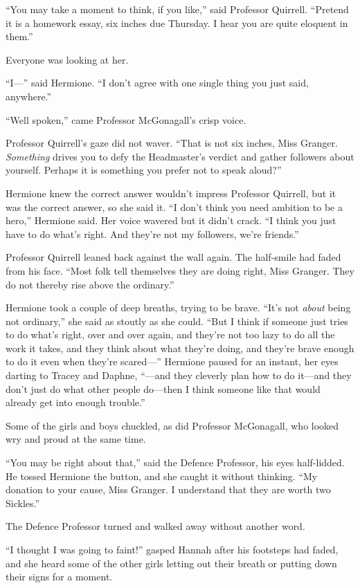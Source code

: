 ``You may take a moment to think, if you like,'' said Professor
Quirrell. ``Pretend it is a homework essay, six inches due Thursday. I
hear you are quite eloquent in them.''

Everyone was looking at her.

``I---'' said Hermione. ``I don't agree with one single thing you just
said, anywhere.''

``Well spoken,'' came Professor McGonagall's crisp voice.

Professor Quirrell's gaze did not waver. ``That is not six inches, Miss
Granger. \emph{Something} drives you to defy the Headmaster's verdict
and gather followers about yourself. Perhaps it is something you prefer
not to speak aloud?''

Hermione knew the correct answer wouldn't impress Professor Quirrell,
but it was the correct answer, so she said it. ``I don't think you need
ambition to be a hero,'' Hermione said. Her voice wavered but it didn't
crack. ``I think you just have to do what's right. And they're not my
followers, we're friends.''

Professor Quirrell leaned back against the wall again. The half-smile
had faded from his face. ``Most folk tell themselves they are doing
right, Miss Granger. They do not thereby rise above the ordinary.''

Hermione took a couple of deep breaths, trying to be brave. ``It's not
\emph{about} being not ordinary,'' she said as stoutly as she could.
``But I think if someone just tries to do what's right, over and over
again, and they're not too lazy to do all the work it takes, and they
think about what they're doing, and they're brave enough to do it even
when they're scared---'' Hermione paused for an instant, her eyes
darting to Tracey and Daphne, ``---and they cleverly plan how to do
it---and they don't just do what other people do---then I think someone
like that would already get into enough trouble.''

Some of the girls and boys chuckled, as did Professor McGonagall, who
looked wry and proud at the same time.

``You may be right about that,'' said the Defence Professor, his eyes
half-lidded. He tossed Hermione the button, and she caught it without
thinking. ``My donation to your cause, Miss Granger. I understand that
they are worth two Sickles.''

The Defence Professor turned and walked away without another word.

``I thought I was going to faint!'' gasped Hannah after his footsteps
had faded, and she heard some of the other girls letting out their
breath or putting down their signs for a moment.


